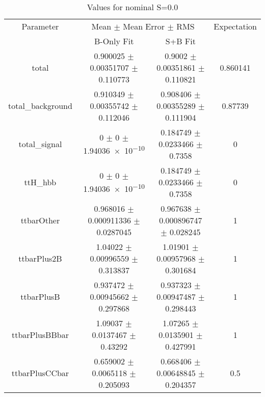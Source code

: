 \begin{table}
\centering
\caption{Values for nominal S=0.0}
\begin{tabular}{cccc}
\toprule
Parameter & \multicolumn{2}{c}{Mean $\pm$ Mean Error $\pm$ RMS} & Expectation\\
 & B-Only Fit & S+B Fit & \\
\midrule
total & \num{0.900025} $\pm$ \num{0.00351707} $\pm$ \num{0.110773} & \num{0.9002} $\pm$ \num{0.00351861} $\pm$ \num{0.110821} & \num{0.860141}\\
total\_background & \num{0.910349} $\pm$ \num{0.00355742} $\pm$ \num{0.112046} & \num{0.908406} $\pm$ \num{0.00355289} $\pm$ \num{0.111904} & \num{0.87739}\\
total\_signal & \num{0} $\pm$ \num{0} $\pm$ \num{1.94036e-10} & \num{0.184749} $\pm$ \num{0.0233466} $\pm$ \num{0.7358} & \num{0}\\
ttH\_hbb & \num{0} $\pm$ \num{0} $\pm$ \num{1.94036e-10} & \num{0.184749} $\pm$ \num{0.0233466} $\pm$ \num{0.7358} & \num{0}\\
ttbarOther & \num{0.968016} $\pm$ \num{0.000911336} $\pm$ \num{0.0287045} & \num{0.967638} $\pm$ \num{0.000896747} $\pm$ \num{0.028245} & \num{1}\\
ttbarPlus2B & \num{1.04022} $\pm$ \num{0.00996559} $\pm$ \num{0.313837} & \num{1.01901} $\pm$ \num{0.00957968} $\pm$ \num{0.301684} & \num{1}\\
ttbarPlusB & \num{0.937472} $\pm$ \num{0.00945662} $\pm$ \num{0.297868} & \num{0.937323} $\pm$ \num{0.00947487} $\pm$ \num{0.298443} & \num{1}\\
ttbarPlusBBbar & \num{1.09037} $\pm$ \num{0.0137467} $\pm$ \num{0.43292} & \num{1.07265} $\pm$ \num{0.0135901} $\pm$ \num{0.427991} & \num{1}\\
ttbarPlusCCbar & \num{0.659002} $\pm$ \num{0.0065118} $\pm$ \num{0.205093} & \num{0.668406} $\pm$ \num{0.00648845} $\pm$ \num{0.204357} & \num{0.5}\\
\bottomrule
\end{tabular}
\end{table}
